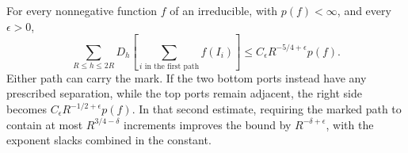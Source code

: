 \begin{proposition}\label{R:geo:marked-pair}
For every nonnegative function $f$ of an irreducible, with $p(f)<\infty$,
and every $\epsilon>0$,
\begin{equation}\label{R:geo:marked-pair-bound}
 \sum_{R\le h\le2R}D_h\left[\sum_{i\text{ in the first path}}f(I_i)\right]
       \le C_\epsilon R^{-5/4+\epsilon}p(f).
\end{equation}
Either path can carry the mark.  If the two bottom ports instead have
any prescribed separation, while the top ports remain adjacent, the
right side becomes $C_\epsilon R^{-1/2+\epsilon}p(f)$.  In that second
estimate, requiring the marked path to contain at most
$R^{3/4-\delta}$ increments improves the bound by
$R^{-\delta+\epsilon}$, with the exponent slacks combined in the
constant.
\end{proposition}
